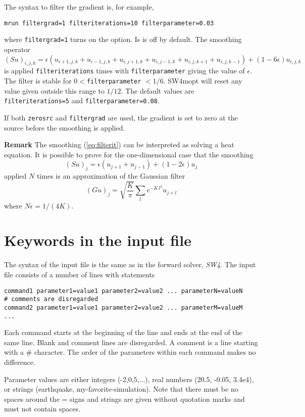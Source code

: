 \documentclass[12pt]{report}
\begin{document}
The syntax to filter the gradient is, for example, 
\begin{verbatim}
mrun filtergrad=1 filteriterations=10 filterparameter=0.03
\end{verbatim}
where {\tt filtergrad=1} turns on the option. Is is off by default. The smoothing
operator
\begin{equation}
(Su)_{i,j,k}= \epsilon( u_{i+1,j,k} + u_{i-1,j,k}+u_{i,j+1,k} + u_{i,j-1,k}+u_{i,j,k+1} + u_{i,j,k-1})
+ (1-6\epsilon)u_{i,j,k}
\label{eq:filterit}
\end{equation}
is applied {\tt filteriterations} times with {\tt filterparameter} giving the value of $\epsilon$.
The filter is stable for $0< ${\tt filterparameter} $ < 1/6$. SW4mopt will reset any
value given outside this range to $1/12$.
The default values are {\tt filteriterations=5} and {\tt filterparameter=0.08}.

If both {\tt zerosrc} and {\tt filtergrad} are used, the gradient is set to zero at the
source before the smoothing is applied.
\par\noindent
{\bf Remark} The smoothing (\ref{eq:filterit}) can be interpreted as solving a heat equation. It is possible
to prove for the one-dimensional case that the smoothing
$$
(Su)_{j}= \epsilon( u_{j+1} + u_{j-1})+ (1-2\epsilon)u_{j}
$$
applied $N$ times is an approximation of the Gaussian filter
$$
 (Gu)_j = \sqrt{\frac{K}{\pi}}\sum_{l}e^{-K\,l^2}u_{j+l}
$$
where $N\epsilon=1/(4K)$. 


\chapter{Keywords in the input file}\label{chap:keywords}
The syntax of the input file is the same as in the forward solver, \emph{SW4}. The input
file consists of a number of lines with statements
\begin{verbatim}
command1 parameter1=value1 parameter2=value2 ... parameterN=valueN
# comments are disregarded
command2 parameter1=value1 parameter2=value2 ... parameterM=valueM
...
\end{verbatim}
Each command starts at the beginning of the line and ends at the end of the same line. Blank and
comment lines are disregarded. A comment is a line starting with a \# character. The order of the
parameters within each command makes no difference. 

Parameter values are either integers (-2,0,5,...), real numbers (20.5, -0.05, 3.4e4), or strings
(earthquake, my-favorite-simulation). Note that there must be no spaces around the = signs and
strings are given without quotation marks and must not contain spaces. 
\end{document}
